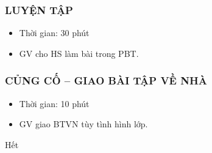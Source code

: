 \documentclass[../main.tex]{subfiles}
\begin{document}
\subsubsection{LUYỆN TẬP}
\begin{hd}
    \begin{itemize}
        \item Thời gian: 30 phút
        \item GV cho HS làm bài trong PBT.
    \end{itemize}
\end{hd}
\subsubsection{CỦNG CỐ -- GIAO BÀI TẬP VỀ NHÀ}
\begin{hd}
    \begin{itemize}
        \item Thời gian: 10 phút
        \item GV giao BTVN tùy tình hình lớp.
    \end{itemize}
\end{hd}

\begin{center}
       \faGg\faGg\quad Hết \quad\faGg\faGg
\end{center}
\end{document}
